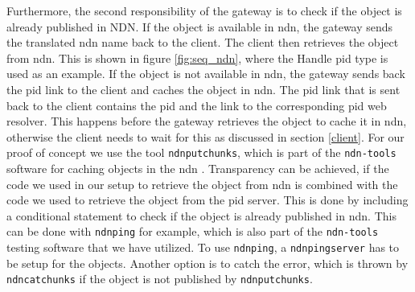 Furthermore, the second responsibility of the gateway is to check if the object is already published in NDN.
If the object is available in \gls{ndn}, the gateway sends the translated \gls{ndn} name back to the client. The client then retrieves the object from \gls{ndn}. This is shown in figure \ref{fig:seq_ndn}, where the Handle \gls{pid} type is used as an example. If the object is not available in \gls{ndn}, the gateway sends back the \gls{pid} link to the client and caches the object in \gls{ndn}. 
The \gls{pid} link that is sent back to the client contains the \gls{pid} and the link to the corresponding \gls{pid} web resolver. This happens before the gateway retrieves the object to cache it in \gls{ndn}, otherwise the client needs to wait for this as discussed in section \ref{client}. For our proof of concept we use the tool \texttt{ndnputchunks}, which is part of the \texttt{ndn-tools} software for caching objects in the \gls{ndn} \cite{ndn-tools}. Transparency can be achieved, if the code we used in our setup to retrieve the object from \gls{ndn} is combined with the code we used to retrieve the object from the \gls{pid} server. This is done by including a conditional statement to check if the object is already published in \gls{ndn}. This can be done with \texttt{ndnping} for example, which is also part of the \texttt{ndn-tools} testing software that we have utilized. To use \texttt{ndnping}, a \texttt{ndnpingserver} has to be setup for the objects. Another option is to catch the error, which is thrown by \texttt{ndncatchunks} if the object is not published by \texttt{ndnputchunks}. 
